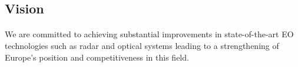 \subsection{Vision}
\paragraph{} We are committed to achieving substantial improvements in state-of-the-art EO technologies such as radar and optical systems leading to a strengthening of Europe's position and competitiveness in this field. 


